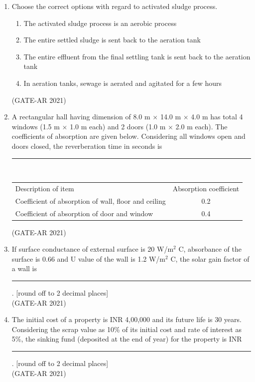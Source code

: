 \documentclass[a4paper,10pt]{article}
\begin{document}
\begin{enumerate}
    \item Choose the correct options with regard to activated sludge process.
    \begin{enumerate}
    \item The activated sludge process is an aerobic process
    \item The entire settled sludge is sent back to the aeration tank
    \item The entire effluent from the final settling tank is sent back to the aeration tank
    \item In aeration tanks, sewage is aerated and agitated for a few hours
    \end{enumerate}
    \hfill (GATE-AR 2021)

    \item A rectangular hall having dimension of 8.0 m $\times$ 14.0 m $\times$ 4.0 m has total 4 windows (1.5 m $\times$ 1.0 m each) and 2 doors (1.0 m $\times$ 2.0 m each). The coefficients of absorption are given below. Considering all windows open and doors closed, the reverberation time in seconds is \rule{2cm}{0.4pt} \\
    \begin{tabular}{ l c }
    Description of item & Absorption coefficient \\
    Coefficient of absorption of wall, floor and ceiling & 0.2 \\
    Coefficient of absorption of door and window & 0.4 \\
    \end{tabular}
    \hfill (GATE-AR 2021)

    \item If surface conductance of external surface is 20 W/m$^2$ \textdegree C, absorbance of the surface is 0.66 and U value of the wall is 1.2 W/m$^2$ \textdegree C, the solar gain factor of a wall is \rule{2cm}{0.4pt}. [round off to 2 decimal places] \\
    \hfill (GATE-AR 2021)

    \item The initial cost of a property is INR 4,00,000 and its future life is 30 years. Considering the scrap value as 10\% of its initial cost and rate of interest as 5\%, the sinking fund (deposited at the end of year) for the property is INR \rule{2cm}{0.4pt}. [round off to 2 decimal places] \\
    \hfill (GATE-AR 2021)


\end{enumerate}
\end{document}
